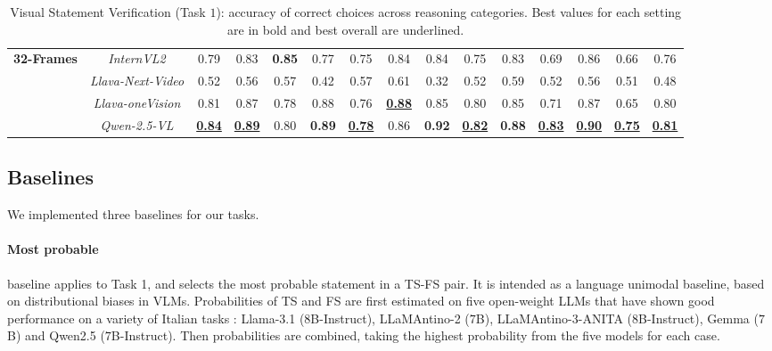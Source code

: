 \begin{table*}[]
{\begin{tabular}{lc|c|c|c|c|c|c|c|cc|cc|cc}
 

 \midrule
 \midrule

 
\multirow{4}{*}{\textbf{32-Frames}} & \textit{InternVL2} & {0.79} & 0.83 &  \textbf{0.85}   &  {0.77} &  {0.75} &  {0.84}&  {0.84} &  {0.75} &  {0.83} &  {0.69} &  {0.86} &  {0.66} &  {0.76} \\
 &  \textit{Llava-Next-Video} &  {0.52} &  0.56 &  {0.57}   &  {0.42} &  {0.57} &  {0.61} &  {0.32}&  {0.52} &  {0.59}&  {0.52} &  {0.56} &  {0.51} &  {0.48} \\
 &  \textit{Llava-oneVision} &  {0.81} &  0.87 &  {0.78}   &  {0.88} &  {0.76} &  \underline{\textbf{0.88}}&  {0.85} &  {0.80} &  {0.85} &  {0.71} &  {0.87} &  {0.65} &  {0.80} \\
 &  \textit{Qwen-2.5-VL} &  \underline{\textbf{0.84}} &  \underline{\textbf{0.89}} &  {0.80}   &  \textbf{0.89} &  \underline{\textbf{0.78}} &  {0.86}&  \textbf{0.92} &  \underline{\textbf{0.82}} &  \textbf{0.88}&  \underline{\textbf{0.83}} &  \underline{\textbf{0.90}} &  \underline{\textbf{0.75}} &  \underline{\textbf{0.81}} \\ 
 \bottomrule
\end{tabular}%
}
\caption{\label{tab:task1_res}
    Visual Statement Verification (Task $1$): accuracy of correct choices across reasoning categories. Best values for each setting are in bold and best overall are underlined.
  }
\end{table*}

\subsection{Baselines} 
We implemented three baselines for our tasks. 

\paragraph{Most probable}  baseline applies to Task 1, and selects the most probable statement in a TS-FS pair. It is intended as a language unimodal baseline, based on distributional biases in VLMs. Probabilities of TS and FS are first estimated on five open-weight LLMs that have shown good performance on a variety of Italian tasks  \cite{magnini2025evalitallmbenchmarkinglargelanguage}: Llama-3.1 ($8$B-Instruct), LLaMAntino-2 ($7$B), LLaMAntino-3-ANITA ($8$B-Instruct), Gemma ($7$B) and Qwen2.5 ($7$B-Instruct). 
Then probabilities are combined,  taking the highest probability from the five models for each case. 



